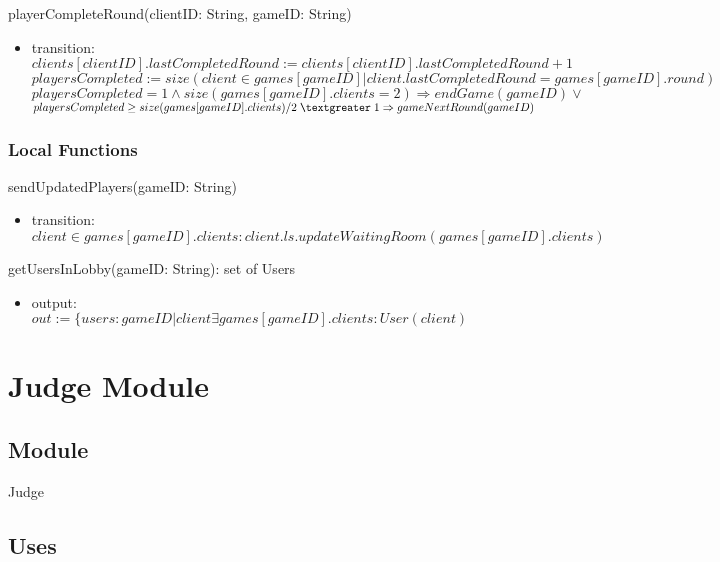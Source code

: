 \documentclass[12pt, titlepage]{article}
\begin{document}
\noindent playerCompleteRound(clientID: String, gameID: String)
\begin{itemize}
\item transition: \\ 
$clients[clientID].lastCompletedRound := clients[clientID].lastCompletedRound + 1$ \\
$playersCompleted := size(client \in games[gameID] | client.lastCompletedRound = games[gameID].round)$ \\ 
$playersCompleted = 1 \land size(games[gameID].clients = 2) \Rightarrow endGame(gameID) \lor$ \\ 
$playersCompleted \geq size(games[gameID].clients)/2 \;\textgreater\; 1 \Rightarrow gameNextRound(gameID)$ \\ 
\end{itemize}


\subsubsection{Local Functions}

\noindent sendUpdatedPlayers(gameID: String)
\begin{itemize}
\item transition: \\ $client \in games[gameID].clients: client.ls.updateWaitingRoom(games[gameID].clients)$
\end{itemize}

\noindent getUsersInLobby(gameID: String): set of Users
\begin{itemize}
\item output: $out := \{ users: gameID | client \exists games[gameID].clients : User(client)$
\end{itemize}


\newpage

\section{Judge Module} \label{Judge}

\subsection{Module}

Judge

\subsection{Uses}
\\
\\
\\
\\
\\
\end{document}

